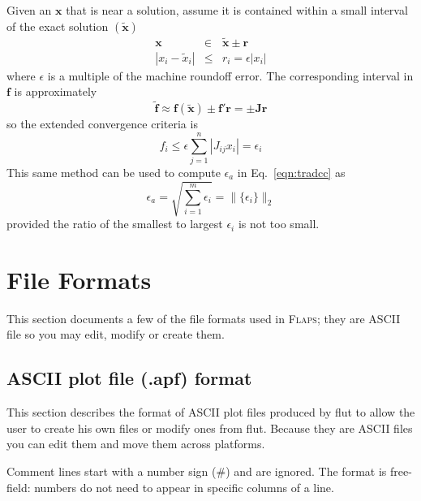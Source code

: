 \documentclass[11pt,openany,twoside]{book}
\numberwithin{equation}{section}		%
\newcommand{\Cmd}[1]{{\sf #1}}
\newcommand{\Flaps}{\textsc{Flaps\:}}
\newcommand{\Matrix}[1]{\boldsymbol{#1}}
\newcommand{\Vector}[1]{\boldsymbol{#1}}
\newcommand{\Eqn}[1]{Eq.\ \ref{#1}}  %
\begin{document}
Given an $\Vector{x}$ that is near a solution, assume it is contained
within a small interval of the exact
solution $(\Vector{\tilde{x}})$
\begin{eqnarray}
\Vector{x} &\in& \tilde{\Vector{x}} \pm \Vector{r} \nonumber \\
|x_i - \tilde{x}_i| &\le& r_i = \epsilon |x_i|
\end{eqnarray}
where $\epsilon$ is a multiple of the machine roundoff error.
The corresponding interval in $\Vector{f}$ is approximately
\begin{equation}
\Vector{\tilde{f}} \approx \Vector{f(\tilde{x})} \pm \Vector{f}' \Vector{r}
	= \pm \Matrix{J}\Vector{r}
\end{equation}
so the extended convergence criteria is
\begin{equation}
f_i \le \epsilon \sum_{j=1}^{n} |J_{ij} x_i| = \epsilon_i
\end{equation}
This same method can be used to compute $\epsilon_a$ in \Eqn{eqn:tradcc} as
\begin{equation}
\epsilon_a = \sqrt{\sum_{i=1}^{m} \epsilon_i} = \|\{\epsilon_i\}\|_2
\end{equation}
provided the ratio of the smallest to largest $\epsilon_i$ is not too small.


\section{File Formats}
This section documents a few of the file formats used in \Flaps; they
are ASCII file so you may edit, modify or create them.

\subsection{ASCII plot file (.apf) format}\label{sect:apf-file}
This section describes the format of ASCII plot files produced by
\Cmd{flut} to allow the user to create his own files or modify ones
from \Cmd{flut}.
Because they are ASCII files
you can edit them and move them across platforms.

Comment lines start with a number sign (\#) and
are ignored.
The format is free-field: numbers do not need to
appear in specific columns of a line.
\end{document}
